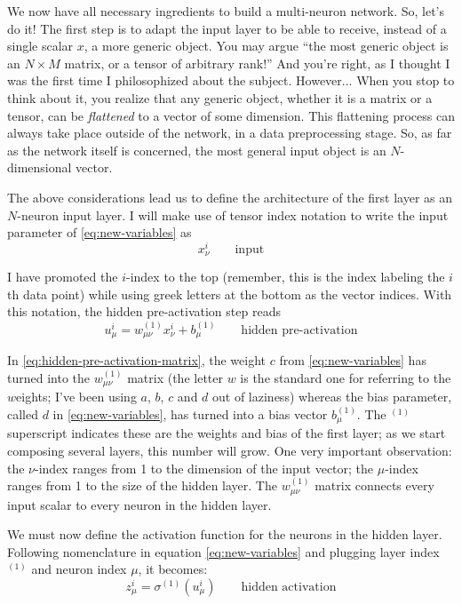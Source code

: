 \documentclass[11pt,a4paper,oneside]{book}
\theoremstyle{definition}
\theoremstyle{plain}
\theoremstyle{remark}
\begin{document}
We now have all necessary ingredients to build a multi-neuron network. So, let's do it! The first step is to adapt the input layer to be able to receive, instead of a single scalar $x$, a more generic object. You may argue ``the most generic object is an $N\times M$ matrix, or a tensor of arbitrary rank!'' And you're right, as I thought I was the first time I philosophized about the subject. However... When you stop to think about it, you realize that any generic object, whether it is a matrix or a tensor, can be {\it flattened} to a vector of some dimension. This flattening process can always take place outside of the network, in a data preprocessing stage. So, as far as the network itself is concerned, the most general input object is an $N$-dimensional vector.

The above considerations lead us to define the architecture of the first layer as an $N$-neuron input layer. I will make use of tensor index notation to write the input parameter of \eqref{eq:new-variables} as
\begin{equation}
    \label{eq:multi-input}
    x^i_\nu \qquad\text{input}
\end{equation}

I have promoted the $i$-index to the top (remember, this is the index labeling the $i$th data point) while using greek letters at the bottom as the vector indices. With this notation, the hidden pre-activation step reads
\begin{equation}
    \label{eq:hidden-pre-activation-matrix}
    u^i_\mu = w^{(1)}_{\mu\nu} x^i_\nu + b^{(1)}_\mu\qquad\text{hidden pre-activation}
\end{equation}

In \eqref{eq:hidden-pre-activation-matrix}, the weight $c$ from \eqref{eq:new-variables} has turned into the $w^{(1)}_{\mu\nu}$ matrix (the letter $w$ is the standard one for referring to the $w$eights; I've been using $a$, $b$, $c$ and $d$ out of laziness) whereas the bias parameter, called $d$ in \eqref{eq:new-variables}, has turned into a bias vector $b^{(1)}_\mu$. The $^{(1)}$ superscript indicates these are the weights and bias of the first layer; as we start composing several layers, this number will grow. One very important observation: the $\nu$-index ranges from 1 to the dimension of the input vector; the $\mu$-index ranges from 1 to the size of the hidden layer. The $w^{(1)}_{\mu\nu}$ matrix connects every input scalar to every neuron in the hidden layer.

We must now define the activation function for the neurons in the hidden layer. Following nomenclature in equation \eqref{eq:new-variables} and plugging layer index $^{(1)}$ and neuron index $\mu$, it becomes:
\begin{equation}
    z^i_\mu = \sigma^{(1)}(u^i_\mu)\qquad\text{hidden activation}
\end{equation}
\end{document}
